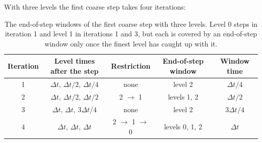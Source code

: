 With three levels the first coarse step takes four iterations:
%
\begin{table}[ht]
  \centering
  \begin{tabular}{ccccc}
  Iteration & Level times after the step & Restriction & End-of-step window & Window time \\ \hline\hline
  1 & $\Delta t$, $\Delta t/2$, $\Delta t/4$ & none & level 2 & $\Delta t/4$ \\
  2 & $\Delta t$, $\Delta t/2$, $\Delta t/2$ & 2 $\to$ 1 & levels 1, 2 & $\Delta t/2$ \\
  3 & $\Delta t$, $\Delta t$, $3\Delta t/4$ & none & level 2 & $3\Delta t/4$ \\
  4 & $\Delta t$, $\Delta t$, $\Delta t$ & 2 $\to$ 1 $\to$ 0 & levels 0, 1, 2 & $\Delta t$ \\ \hline\hline
  \end{tabular}
  \caption{The end-of-step windows of the first coarse step with three levels. Level 0 steps in iteration 1 and level 1 in iterations 1 and 3, but each is covered by an end-of-step window only once the finest level has caught up with it.}
  \label{tab:end_of_step_windows}
\end{table}

